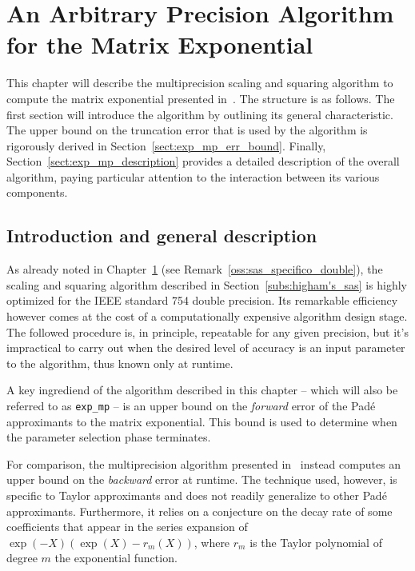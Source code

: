 \chapter{An Arbitrary Precision Algorithm for the Matrix Exponential}\label{capitolo:4}
This chapter will describe the multiprecision scaling and squaring algorithm to compute the matrix exponential presented in~\cite{higham:hf19_mpexpm}. The structure is as follows. The first section will introduce the algorithm by outlining its general characteristic. The upper bound on the truncation error that is used by the algorithm is rigorously derived in Section~\ref{sect:exp_mp_err_bound}. Finally, Section~\ref{sect:exp_mp_description} provides a detailed description of the overall algorithm, paying particular attention to the interaction between its various components.


\section{Introduction and general description}\label{sect:exp_mp_intro}
As already noted in Chapter~\ref{capitolo:4} (see Remark~\ref{oss:sas_specifico_double}), the scaling and squaring algorithm described in Section~\ref{subs:higham's_sas} is highly optimized for the \textsc{IEEE} standard 754 double precision. Its remarkable efficiency however comes at the cost of a computationally expensive algorithm design stage. The followed procedure is, in principle, repeatable for any given precision, but it's impractical to carry out when the desired level of accuracy is an input parameter to the algorithm, thus known only at runtime. 
\smallskip 

A key ingrediend of the algorithm described in this chapter -- which will also be referred to as \texttt{exp\_mp} -- is an upper bound on the \emph{forward} error of the Padé approximants to the matrix exponential. This bound is used to determine when the parameter selection phase terminates.

For comparison, the multiprecision algorithm presented in~\cite{exptayotf18} instead computes an upper bound on the \emph{backward} error at runtime. The technique used, however, is specific to Taylor approximants and does not readily generalize to other Padé approximants. Furthermore, it relies on a conjecture on the decay rate of some coefficients that appear in the series expansion of $\exp(-X)(\exp(X)-r_m(X))$, where $r_m$ is the Taylor polynomial of degree $m$ the exponential function.
\smallskip 

